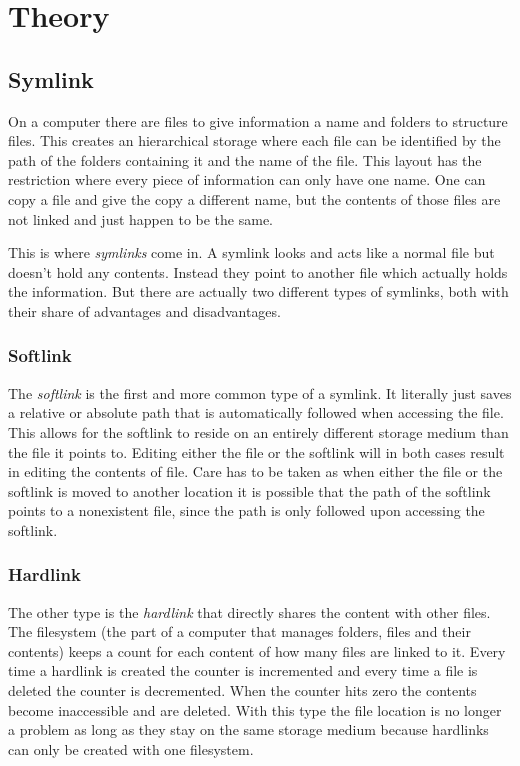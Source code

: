 \section{Theory}
\def\kapitelautor{Clemens Stadlbauer}

\subsection{Symlink}%
\label{subsec:theory:symlink}

On a computer there are files to give information a name and folders to
structure files. This creates an hierarchical storage where each file can be
identified by the path of the folders containing it and the name of the file.
This layout has the restriction where every piece of information can only have
one name. One can copy a file and give the copy a different name, but the
contents of those files are not linked and just happen to be the same.

This is where \emph{symlinks} come in. A symlink looks and acts like a normal
file but doesn't hold any contents. Instead they point to another file which
actually holds the information. But there are actually two different types of
symlinks, both with their share of advantages and disadvantages.

\subsubsection{Softlink}%
\label{theory:softlink}

The \emph{softlink} is the first and more common type of a symlink. It
literally just saves a relative or absolute path that is automatically followed
when accessing the file. This allows for the softlink to reside on an entirely
different storage medium than the file it points to. Editing either the file or
the softlink will in both cases result in editing the contents of file. Care
has to be taken as when either the file or the softlink is moved to another
location it is possible that the path of the softlink points to a nonexistent
file, since the path is only followed upon accessing the softlink.

\subsubsection{Hardlink}%
\label{theory:hardlink}

The other type is the \emph{hardlink} that directly shares the content with
other files. The filesystem (the part of a computer that manages folders, files
and their contents) keeps a count for each content of how many files are linked
to it. Every time a hardlink is created the counter is incremented and every
time a file is deleted the counter is decremented. When the counter hits zero
the contents become inaccessible and are deleted. With this type the file
location is no longer a problem as long as they stay on the same storage medium
because hardlinks can only be created with one filesystem.

